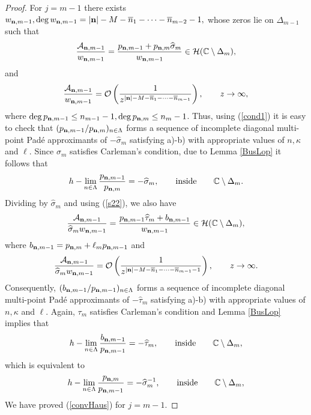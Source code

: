 \documentclass[10pt,a4paper]{article}
\theoremstyle{definition}
\theoremstyle{remark}
\numberwithin{equation}{section}
\begin{document}
\begin{proof}
For $j=m-1$   there exists $w_{{\bf n},m-1}, \deg w_{{\bf n},m-1} = |{\bf n}| -M- \overline{n}_{1} - \cdots - \overline{n}_{m-2} -1,$ whose zeros lie on $\Delta_{m-1}$ such that
$$\frac{\mathcal{A}_{{\bf n},m-1}}{w_{{\bf n},m-1}} = \frac{p_{{\bf n},m-1} + p_{{\bf n},m} \widehat{\sigma}_m}{w_{{\bf n},m-1}} \in \mathcal{H}(\mathbb{C} \setminus \Delta_m),$$
and
$$  \frac{\mathcal{A}_{{\bf n},m-1}}{w_{{\bf n},m-1}} = \mathcal{O}\left(\frac{1}{z^{|{\bf n}| -M- \overline{n}_1 - \cdots-\overline{n}_{m-1}}}\right) ,\qquad  z \to \infty,
$$
where $\deg  p_{{\bf n},m-1} \leq n_{m-1} -1, \deg  p_{{\bf n},m} \leq n_{m} -1$. Thus, using (\ref{cond1}) it is easy to check that  $(p_{{\bf n},m-1}/p_{{\bf n},m})_{ n \in \Lambda}$ forms a sequence of  incomplete diagonal multi-point Pad\'e approximants of $-\widehat{\sigma}_m$ satisfying a)-b) with appropriate values of $n,\kappa$ and $\ell$. Since $\sigma_m$ satisfies Carleman's condition, due  to Lemma \ref{BusLop} it follows that
\[ h-\lim_{n\in \Lambda} \frac{p_{{\bf n},m-1}}{p_{{\bf n},m}} = - \widehat{\sigma}_m, \qquad \mbox{inside} \qquad \mathbb{C} \setminus \Delta_m.
\]
Dividing by $\widehat{\sigma}_m$ and using (\ref{s22}), we also have
\[ \frac{\mathcal{A}_{{\bf n},m-1}}{\widehat{\sigma}_m w_{{\bf n},m-1}} = \frac{p_{{\bf n},m-1} \widehat {\tau  }_m + b_{{\bf n},m-1}}{w_{{\bf n},m-1}} \in \mathcal{H}(\mathbb{C} \setminus \Delta_m),
\]
where $b_{{\bf n},m-1} = p_{{\bf n},m} + \ell_m p_{{\bf n},m-1}$ and
\[  \frac{\mathcal{A}_{{\bf n},m-1}}{\widehat{\sigma}_m w_{{\bf n},m-1}} = \mathcal{O}\left(\frac{1}{z^{|{\bf n}| -M- \overline{n}_1 - \cdots-\overline{n}_{m-1}-1}}\right) ,\qquad  z \to \infty.
\]
Consequently, $(b_{{\bf n},m-1}/p_{{\bf n},m-1})_{ n \in \Lambda}$ forms a sequence of  incomplete diagonal multi-point Pad\'e approximants of $-\widehat{\tau}_m$ satisfying a)-b) with appropriate values of $n,\kappa$ and $\ell$. Again, $\tau_m$ satisfies Carleman's condition  and  Lemma \ref{BusLop} implies that
\[ h-\lim_{n\in \Lambda} \frac{b_{{\bf n},m-1}}{p_{{\bf n},m-1}} = - \widehat{\tau}_m, \qquad \mbox{inside} \qquad \mathbb{C} \setminus \Delta_m,
\]
which is equivalent to
\[ h-\lim_{n\in \Lambda} \frac{p_{{\bf n},m}}{p_{{\bf n},m-1}} = - \widehat{\sigma}_m^{-1}, \qquad \mbox{inside} \qquad \mathbb{C} \setminus \Delta_m,
\]
We have proved (\ref{convHaus}) for $j=m-1$.



\end{proof}
\end{document}
